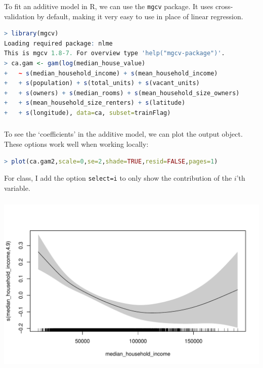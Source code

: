 \documentclass[xetex,mathserif,serif,aspectratio=169]{beamer}
\begin{document}
\begin{frame}[fragile] \frametitle{} \oldB \small

To fit an additive model in R, we can use the \texttt{mgcv}
package. It uses cross-validation by default, making it very
easy to use in place of linear regression.
\begin{lstlisting}[language=R, basicstyle=\fontsize{8pt}{10pt}\selectfont\ttfamily]
> library(mgcv)
Loading required package: nlme
This is mgcv 1.8-7. For overview type 'help("mgcv-package")'.
> ca.gam <- gam(log(median_house_value)
+   ~ s(median_household_income) + s(mean_household_income)
+   + s(population) + s(total_units) + s(vacant_units)
+   + s(owners) + s(median_rooms) + s(mean_household_size_owners)
+   + s(mean_household_size_renters) + s(latitude)
+   + s(longitude), data=ca, subset=trainFlag)
\end{lstlisting}

\end{frame}

\begin{frame}[fragile] \frametitle{} \oldB \small

To see the `coefficients' in the additive model, we
can plot the output object. These options work well
when working locally:
\begin{lstlisting}[language=R, basicstyle=\fontsize{8pt}{10pt}\selectfont\ttfamily]
> plot(ca.gam2,scale=0,se=2,shade=TRUE,resid=FALSE,pages=1)
\end{lstlisting}
For class, I add the option \texttt{select=i} to only
show the contribution of the $i$'th variable.

\end{frame}

\begin{frame}[fragile] \frametitle{} \oldB \small

\begin{center}
\includegraphics[width=\textwidth]{img/gamRug01.pdf}
\end{center}

\end{frame}
\end{document}
